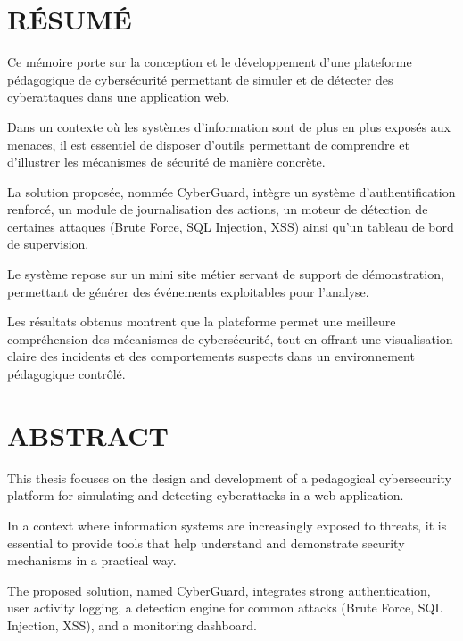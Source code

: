 \documentclass[a4paper,12pt]{report}
\begin{document}
    \chapter*{RÉSUMÉ}
    
    Ce mémoire porte sur la conception et le développement d’une plateforme pédagogique de cybersécurité permettant de simuler et de détecter des cyberattaques dans une application web.
    
    Dans un contexte où les systèmes d’information sont de plus en plus exposés aux menaces, il est essentiel de disposer d’outils permettant de comprendre et d’illustrer les mécanismes de sécurité de manière concrète.
    
    La solution proposée, nommée CyberGuard, intègre un système d’authentification renforcé, un module de journalisation des actions, un moteur de détection de certaines attaques (Brute Force, SQL Injection, XSS) ainsi qu’un tableau de bord de supervision.
    
    Le système repose sur un mini site métier servant de support de démonstration, permettant de générer des événements exploitables pour l’analyse.
    
    Les résultats obtenus montrent que la plateforme permet une meilleure compréhension des mécanismes de cybersécurité, tout en offrant une visualisation claire des incidents et des comportements suspects dans un environnement pédagogique contrôlé.
    
    \vspace{0.5cm}
    
    \chapter*{ABSTRACT}
    
    This thesis focuses on the design and development of a pedagogical cybersecurity platform for simulating and detecting cyberattacks in a web application.
    
    In a context where information systems are increasingly exposed to threats, it is essential to provide tools that help understand and demonstrate security mechanisms in a practical way.
    
    The proposed solution, named CyberGuard, integrates strong authentication, user activity logging, a detection engine for common attacks (Brute Force, SQL Injection, XSS), and a monitoring dashboard.
    
\end{document}
